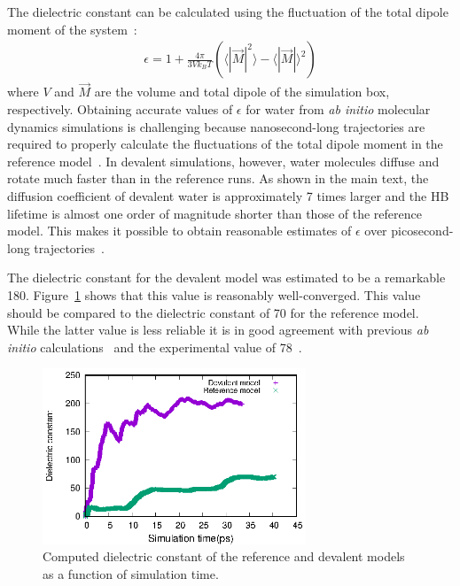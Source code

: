\documentclass[journal=jacsat,manuscript=article]{achemso}
\newcommand{\bea}{\begin{eqnarray}}
\newcommand{\eea}{\end{eqnarray}}
\begin{document}
The dielectric constant can be calculated using the fluctuation of the total dipole moment of the system~\cite{neumann1983dipole,adams1981theory}:
%
\bea
\epsilon = 1+\frac{4\pi}{3V k_B T}  (  \langle |\vec{M}|^2 \rangle  - \langle |\vec{M}| \rangle ^2) \label{Eq:dielectric}
\eea
%
where $V$ and $\vec{M}$ are the volume and total dipole of the simulation box, respectively. 
Obtaining accurate values of $\epsilon$ for water from \emph{ab initio} molecular dynamics simulations is challenging because nanosecond-long trajectories are required to properly calculate the fluctuations of the total dipole moment in the reference model~\cite{zhang2016computing}. 
In devalent simulations, however, water molecules diffuse and rotate much faster than in the reference runs. As shown in the main text, the diffusion coefficient of devalent water is approximately 7 times larger and the HB lifetime is almost one order of magnitude shorter than those of the reference model. This makes it possible to obtain reasonable estimates of $\epsilon$ over picosecond-long trajectories~\cite{pan2013dielectric}. 

The dielectric constant for the devalent model was estimated to be a remarkable 180. Figure~\ref{Fig:dielectric} shows that this value is reasonably well-converged. This value should be compared to the dielectric constant of 70 for the reference model. While the latter value is less reliable it is in good agreement with previous \emph{ab initio} calculations~\cite{sharma2007dipolar} and the experimental value of 78~\cite{haynes2014crc}.

\begin{figure}[t]
\includegraphics[width=0.7\textwidth]{dielectric}
\caption{Computed dielectric constant of the reference and devalent models as a function of simulation time.}\label{Fig:dielectric}
\end{figure} 
\end{document}
